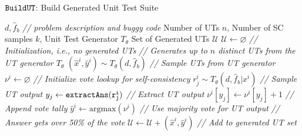 
\begin{algorithm}[t]
\caption{$\tt{BuildUT}$: Build Generated Unit Test Suite}
\label{alg:gen}
\begin{algorithmic}{}
     $d, \hat{f}_b$ \textcolor{comm}{\footnotesize{\textit{// problem description and buggy code}}}
      Number of UTs $n$, Number of SC samples $k$, Unit Test Generator $T_\theta$
     Set of Generated UTs $\mathcal{U}$
    \State $\mathcal{U} \gets \varnothing$  \textcolor{comm}{\footnotesize{\textit{// Initialization, i.e., no generated UTs}}} 
        \State \textcolor{comm}{\footnotesize{\textit{// Generates up to $n$ distinct UTs from the UT generator $T_\theta$}}} 
        \State $(\hat{x}^i, \hat{y}^i) \sim T_\theta(d, \hat{f}_b)$ \textcolor{comm}{\footnotesize{\textit{// Sample UTs from UT generator}}}
        \State $\nu^i \gets \varnothing$  \textcolor{comm}{\footnotesize{\textit{// Initialize vote lookup for self-consistency}}} 
        \State $r^i_j \sim T_\theta(d, \hat{f}_b | x^i)$ \textcolor{comm}{\footnotesize{\textit{// Sample UT output}}}
        \State $y_j \gets \tt{extractAns}(r^i_j)$ \textcolor{comm}{\footnotesize{\textit{// Extract UT output}}}
        \State $\nu^i[y_j] \gets \nu^i[y_j] + 1$ \textcolor{comm}{\footnotesize{\textit{// Append vote tally}}}
        \EndFor
        \State $\hat{y}^i \gets \mathrm{arg max}(\nu^i)$
        \textcolor{comm}{\footnotesize{\textit{// Use majority vote for UT output}}}
        \textcolor{comm}{\footnotesize{\textit{// Answer gets over 50\% of the vote}}}
        \State $\mathcal{U} \gets \mathcal{U} + (\hat{x}^i, \hat{y}^i)$ \textcolor{comm}{\footnotesize{\textit{// Add to generated UT set}}}
        \EndIf
          
        \EndIf
    \EndFor
\end{algorithmic}

\end{algorithm}



